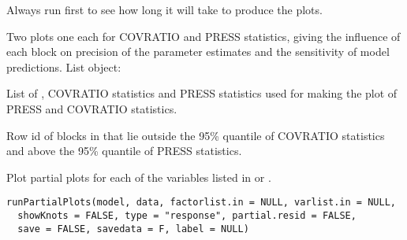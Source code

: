\documentclass[a4paper]{book}
\begin{document}
%
\begin{Details}\relax
Always run  first to see how long it will take to produce the plots.
\end{Details}
%
\begin{Value}
Two plots one each for COVRATIO and PRESS statistics, giving the influence of each block on precision of the parameter estimates and the sensitivity of model predictions.
List object:
\begin{ldescription}
\item[\code{influenceData}] List of , COVRATIO statistics and PRESS statistics used for making the plot of PRESS and COVRATIO statistics.
\item[\code{influencePoints}] Row id of blocks in  that lie outside the 95\% quantile of COVRATIO statistics and above the 95\% quantile of PRESS statistics.
\end{ldescription}
\end{Value}
%
\begin{Examples}
\end{Examples}
%
\begin{Description}\relax
Plot partial plots for each of the variables listed in  or .
\end{Description}
%
\begin{Usage}
\begin{verbatim}
runPartialPlots(model, data, factorlist.in = NULL, varlist.in = NULL,
  showKnots = FALSE, type = "response", partial.resid = FALSE,
  save = FALSE, savedata = F, label = NULL)
\end{verbatim}
\end{Usage}
\end{document}
